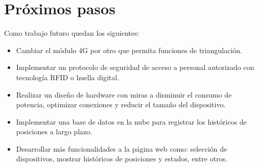 \section{Próximos pasos}

Como trabajo futuro quedan los siguientes:

\begin{itemize}
\item Cambiar el módulo 4G por otro que permita funciones de triangulación. 

\item Implementar un protocolo de seguridad de acceso a personal autorizado con tecnología RFID o huella digital. 

\item Realizar un diseño de hardware con miras a disminuir el consumo de potencia, optimizar conexiones y reducir el tamaño del dispositivo.

\item Implementar una base de datos en la nube para registrar los históricos de posiciones a largo plazo.  

\item Desarrollar más funcionalidades a la página web como: selección de dispositivos, mostrar históricos de posiciones y estados, entre otros. 
\end{itemize}
